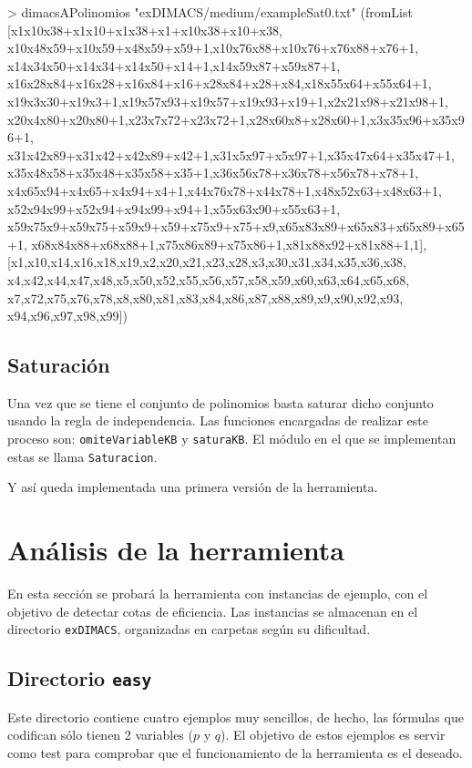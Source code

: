 \begin{code}
> dimacsAPolinomios "exDIMACS/medium/exampleSat0.txt"
(fromList [x1x10x38+x1x10+x1x38+x1+x10x38+x10+x38,
x10x48x59+x10x59+x48x59+x59+1,x10x76x88+x10x76+x76x88+x76+1,
x14x34x50+x14x34+x14x50+x14+1,x14x59x87+x59x87+1,
x16x28x84+x16x28+x16x84+x16+x28x84+x28+x84,x18x55x64+x55x64+1,
x19x3x30+x19x3+1,x19x57x93+x19x57+x19x93+x19+1,x2x21x98+x21x98+1,
x20x4x80+x20x80+1,x23x7x72+x23x72+1,x28x60x8+x28x60+1,x3x35x96+x35x96+1,
x31x42x89+x31x42+x42x89+x42+1,x31x5x97+x5x97+1,x35x47x64+x35x47+1,
x35x48x58+x35x48+x35x58+x35+1,x36x56x78+x36x78+x56x78+x78+1,
x4x65x94+x4x65+x4x94+x4+1,x44x76x78+x44x78+1,x48x52x63+x48x63+1,
x52x94x99+x52x94+x94x99+x94+1,x55x63x90+x55x63+1,
x59x75x9+x59x75+x59x9+x59+x75x9+x75+x9,x65x83x89+x65x83+x65x89+x65+1,
x68x84x88+x68x88+1,x75x86x89+x75x86+1,x81x88x92+x81x88+1,1],
[x1,x10,x14,x16,x18,x19,x2,x20,x21,x23,x28,x3,x30,x31,x34,x35,x36,x38,
x4,x42,x44,x47,x48,x5,x50,x52,x55,x56,x57,x58,x59,x60,x63,x64,x65,x68,
x7,x72,x75,x76,x78,x8,x80,x81,x83,x84,x86,x87,x88,x89,x9,x90,x92,x93,
x94,x96,x97,x98,x99])
\end{code}
\newpage

\subsection{Saturación}

Una vez que se tiene el conjunto de polinomios basta saturar dicho conjunto usando la regla de independencia. Las funciones encargadas de realizar este proceso son: \texttt{omiteVariableKB} y \texttt{saturaKB}. El módulo en el que se implementan estas se llama \texttt{Saturacion}.


Y así queda implementada una primera versión de la herramienta.

\newpage
\section{Análisis de la herramienta}

En esta sección se probará la herramienta con instancias de ejemplo, con el objetivo de detectar cotas de eficiencia. Las instancias se almacenan en el directorio \texttt{exDIMACS}, organizadas en carpetas según su dificultad.

\subsection{Directorio \texttt{easy}}
Este directorio contiene cuatro ejemplos muy sencillos, de hecho, las fórmulas que codifican sólo  tienen 2 variables ($p$ y $q$). El objetivo de estos ejemplos es servir como test para comprobar que el funcionamiento de la herramienta es el deseado.

